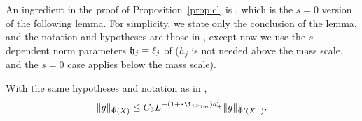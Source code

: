 An ingredient in the proof of Proposition~\ref{prop:cl} is
\cite[Lemma~\ref{loc-lem:phij}]{BS-rg-loc}, which is the $s=0$ version of
the following lemma.  For simplicity, we state only the conclusion of the lemma,
and the notation and hypotheses are those in
\cite[Lemma~\ref{loc-lem:phij}]{BS-rg-loc}, except now we use the
$s$-dependent norm parameters
$\mathfrak{h}_j=\ell_j$ of  ($h_j$ is not needed above the mass scale, and
the $s=0$ case applies below the mass scale).

\begin{lemma}
\label{lem:phiij-improved}
With the same hypotheses and notation as in \cite[Lemma~\ref{loc-lem:phij}]{BS-rg-loc},
\begin{equation}
\lbeq{gbd-improved}
\|g\|_{\tilde{\Phi} (X)}
\leq
\bar C_3
L^{- (1 + s \1_{j \geq j_m}) d_+'}  \|g\|_{\tilde{\Phi}' (X_+)}.
\end{equation}
\end{lemma}


